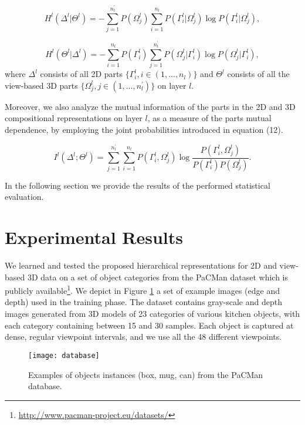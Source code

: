 \documentclass[runningheads]{llncs}
\begin{document}
\begin{equation}
 H^l(\Delta^l|\Theta^l) = -\sum\limits_{j=1}^{n_l^{'}}P({\Omega_j^l})\sum\limits_{i=1}^{n_l}P(\Gamma_i^l|\Omega_j^l)\log P(\Gamma_i^l|\Omega_j^l), 
\end{equation}

\begin{equation}
 H^l(\Theta^l|\Delta^l) = -\sum\limits_{i=1}^{n_l}P({\Gamma_i^l})\sum\limits_{j=1}^{n_l^{'}}P(\Omega_j^l|\Gamma_i^l)\log P(\Omega_j^l|\Gamma_i^l),
\end{equation}
where $\Delta^l$ consists of all 2D parts $\{\Gamma_i^l, i \in (1,\ldots,n_l)\}$ and $\Theta^l$ consists of all the view-based 3D parts $\{\Omega_j^l, j \in (1,\ldots,n_l^{'})\}$ on layer $l$.

Moreover, we also analyze the mutual information of the parts in the 2D and 3D compositional representations on layer $l$, as a measure of the parts mutual dependence, by employing the joint probabilities introduced in equation (12).

\begin{equation}
 I^l(\Delta^l;\Theta^l) = \sum\limits_{j=1}^{n_l^{'}}\sum\limits_{i=1}^{n_l}P({\Gamma_i^l},\Omega_j^l)\log \frac{P({\Gamma_i^l},\Omega_j^l)}{P({\Gamma_i^l})P(\Omega_j^l)}.
\end{equation}

In the following section we provide the results of the performed statistical evaluation.

\section{Experimental Results}

We learned and tested the proposed hierarchical representations for 2D and view-based 3D data on a set of object categories from the PaCMan dataset which is publicly available\footnote{\url{http://www.pacman-project.eu/datasets/}}. We depict in Figure \ref{database} a set of example images (edge and depth) used in the training phase. The dataset contains gray-scale and depth images generated from 3D models of 23 categories of various kitchen objects, with each category containing between 15 and 30 samples. Each object is captured at dense, regular viewpoint intervals, and we use all the 48 different viewpoints. 

\begin{figure}
\begin{center}
\texttt{[image: database]}
\end{center}
\caption{Examples of objects instances (box, mug, can) from the PaCMan database.}
\label{database}
\end{figure}
\end{document}
